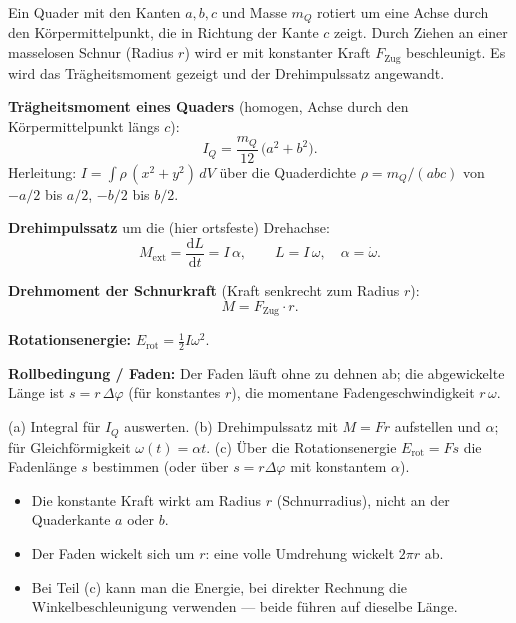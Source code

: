 
Ein Quader mit den Kanten $a,b,c$ und Masse $m_Q$ rotiert um eine Achse durch
den Körpermittelpunkt, die in Richtung der Kante $c$ zeigt. Durch Ziehen an
einer masselosen Schnur (Radius $r$) wird er mit konstanter Kraft $F_\mathrm{Zug}$
beschleunigt. Es wird das Trägheitsmoment gezeigt und der Drehimpulssatz
angewandt.

\begin{werkzeugkasten}[Werkzeuge]
\textbf{Trägheitsmoment eines Quaders} (homogen, Achse durch den
Körpermittelpunkt längs $c$):
\begin{equation}
  I_Q = \frac{m_Q}{12}\,\bigl(a^2+b^2\bigr).
\end{equation}
Herleitung: $I=\int\rho\,(x^2+y^2)\,dV$ über die Quaderdichte
$\rho=m_Q/(abc)$ von $-a/2$ bis $a/2$, $-b/2$ bis $b/2$.

\textbf{Drehimpulssatz} um die (hier ortsfeste) Drehachse:
\begin{equation}
  M_\mathrm{ext} = \frac{\mathrm d L}{\mathrm dt} = I\,\alpha,
  \qquad L=I\,\omega,\quad \alpha=\dot\omega.
\end{equation}

\textbf{Drehmoment der Schnurkraft} (Kraft senkrecht zum Radius $r$):
\begin{equation}
  M = F_\mathrm{Zug}\cdot r.
\end{equation}

\textbf{Rotationsenergie:} $E_\mathrm{rot}=\frac12 I\omega^2$.

\textbf{Rollbedingung / Faden:} Der Faden läuft ohne zu dehnen ab; die
abgewickelte Länge ist $s=r\,\Delta\varphi$ (für konstantes $r$), die
momentane Fadengeschwindigkeit $r\,\omega$.
\end{werkzeugkasten}

\begin{werkzeugkasten}
(a) Integral für $I_Q$ auswerten. (b) Drehimpulssatz mit $M=F r$ aufstellen
und $\alpha$; für Gleichförmigkeit $\omega(t)=\alpha t$. (c) Über die
Rotationsenergie $E_\mathrm{rot}=F s$ die Fadenlänge $s$ bestimmen (oder über
$s=r\Delta\varphi$ mit konstantem $\alpha$).
\end{werkzeugkasten}

\begin{achtung}
\begin{itemize}
  \item Die konstante Kraft wirkt am Radius \emph{$r$} (Schnurradius), nicht an
       der Quaderkante $a$ oder $b$.
  \item Der Faden wickelt sich um $r$: eine volle Umdrehung wickelt
       $2\pi r$ ab.
  \item Bei Teil (c) kann man die Energie, bei direkter Rechnung die
       Winkelbeschleunigung verwenden --- beide führen auf dieselbe Länge.
\end{itemize}
\end{achtung}

